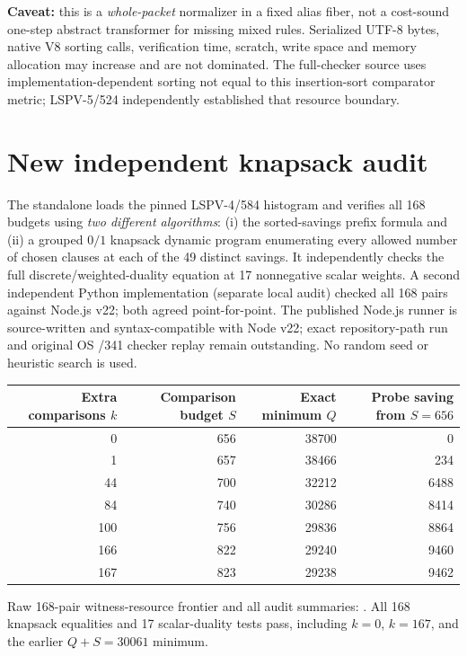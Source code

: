\documentclass[11pt]{article}
\begin{document}
\noindent\textbf{Caveat:} this is a \emph{whole-packet} normalizer in a fixed alias fiber, not a cost-sound one-step abstract transformer for missing mixed rules. Serialized UTF-8 bytes, native V8 sorting calls, verification time, scratch, write space and memory allocation may increase and are not dominated. The full-checker source uses implementation-dependent sorting not equal to this insertion-sort comparator metric; LSPV-5/524 independently established that resource boundary.

\section*{New independent knapsack audit}
The standalone  loads the pinned LSPV-4/584 histogram and verifies all 168 budgets using \emph{two different algorithms}: (i) the sorted-savings prefix formula and (ii) a grouped $0/1$ knapsack dynamic program enumerating every allowed number of chosen clauses at each of the 49 distinct savings. It independently checks the full discrete/weighted-duality equation at 17 nonnegative scalar weights. A second independent Python implementation (separate local audit) checked all 168 pairs against Node.js v22; both agreed point-for-point. The published Node.js runner is source-written and syntax-compatible with Node v22; exact repository-path run and original OS /341 checker replay remain outstanding. No random seed or heuristic search is used.

\begin{center}
\begin{tabular}{@{}rrrr@{}}\toprule
Extra comparisons $k$ & Comparison budget $S$ & Exact minimum $Q$ & Probe saving from $S=656$\\\midrule
0 & 656 & 38700 & 0\\
1 & 657 & 38466 & 234\\
44 & 700 & 32212 & 6488\\
84 & 740 & 30286 & 8414\\
100 & 756 & 29836 & 8864\\
166 & 822 & 29240 & 9460\\
167 & 823 & 29238 & 9462\\\bottomrule
\end{tabular}
\end{center}
Raw 168-pair witness-resource frontier and all audit summaries:
. All 168 knapsack equalities and 17 scalar-duality tests pass, including $k=0$, $k=167$, and the earlier $Q+S=30061$ minimum.
\end{document}
